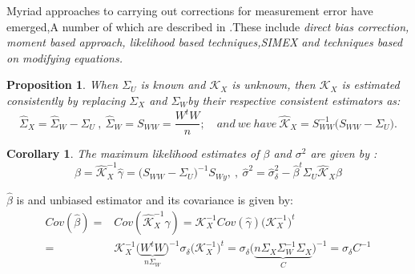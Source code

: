 \documentclass[12pt]{report}
\newtheorem {proposition}{Proposition}[section]  %
\newtheorem{corollaire}{Corollary}
\begin{document}
Myriad approaches to carrying out corrections for measurement error have emerged,A number of which are described in \cite{nref1}.These include \textit{direct bias correction, moment based approach, likelihood based techniques,SIMEX and techniques based on modifying equations.} 

\begin{proposition}
	When  $\Sigma_{U}$ is known and $\mathcal{K}_{X}$ is unknown, then $\mathcal{K}_{X}$ is estimated consistently by replacing $\Sigma_{X}$ and $\Sigma_{W}$by their respective consistent estimators as:
	\begin{equation}
		\hat{\Sigma}_{X}=\hat{\Sigma}_{W}-\Sigma_{U}\ ,\ \hat{\Sigma}_{W}=S_{WW}=\frac{W^{t}W}{n};\quad and\ we\ have\ \hat{\mathcal{K}}_{X}=S_{WW}^{-1}\big(S_{WW}-\Sigma_{U}\big).
		\label{est}
	\end{equation}
\end{proposition}

\begin{corollaire}
The maximum likelihood estimates of $\beta$ and $\sigma^{2}$ are given by :
\begin{equation}
	\hat{\beta}=\hat{\mathcal{K}}_{X}^{-1}\hat{\gamma}=\big(S_{WW}-\Sigma_{U}\big)^{-1}S_{Wy},\ ,\ \hat{\sigma}^{2}=\hat{\sigma}_{\delta}^{2}-\hat{\beta}^{t}\Sigma_{U}\hat{\mathcal{K}}_{X}\hat{\beta}
	\label{f53}
\end{equation}
\end{corollaire}
$\hat{\beta}$ is and unbiased estimator and its covariance is given by:
	\begin{align*}
		Cov(\hat{\beta})=&Cov(\hat{\mathcal{K}}_{X}^{-1}\hat{\gamma})=\mathcal{K}_{X}^{-1}Cov(\hat{\gamma})\big(\mathcal{K}_{X}^{-1}\big)^{t}\\
		=& \mathcal{K}_{X}^{-1}\big(\underbrace{W^{t}W}_{n\Sigma_{W}}\big)^{-1}\sigma_{\delta}\big(\mathcal{K}_{X}^{-1}\big)^{t}=\sigma_{\delta}\big(\underbrace{n\Sigma_{X}\Sigma_{W}^{-1}\Sigma_{X}}_{C}\big)^{-1} =\sigma_{\delta}C^{-1}
		\label{f54}
	\end{align*}
\end{document}
